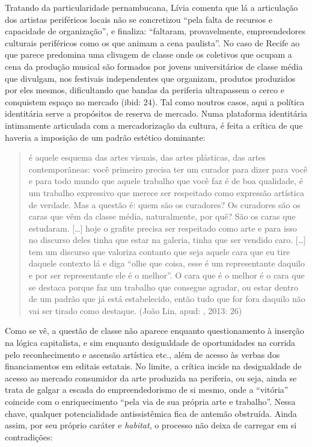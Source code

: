 Tratando da particularidade pernambucana, Lívia comenta que lá a
articulação dos artistas periféricos locais não se concretizou ``pela
falta de recursos e capacidade de organização'', e finaliza: ``faltaram,
provavelmente, empreendedores culturais periféricos como os que animam a
cena paulista''. No caso de Recife ao que parece predomina uma clivagem
de classe onde os coletivos que ocupam a cena da produção musical são
formados por jovens universitários de classe média que divulgam, nos
festivais independentes que organizam, produtos produzidos por eles
mesmos, dificultando que bandas da periferia ultrapassem o cerco e
conquistem espaço no mercado (ibid: 24). Tal como noutros casos, aqui a
política identitária serve a propósitos de reserva de mercado. Numa
plataforma identitária intimamente articulada com a mercadorização da
cultura, é feita a crítica de que haveria a imposição de um padrão
estético dominante:

\begin{quote}
é aquele esquema das artes visuais, das artes plásticas, das artes
contemporâneas: você primeiro precisa ter um curador para dizer para
você e para todo mundo que aquele trabalho que você faz é de boa
qualidade, é um trabalho expressivo que merece ser respeitado como
expressão artística de verdade. Mas a questão é: quem são os curadores?
Os curadores são os caras que vêm da classe média, naturalmente, por
quê? São os caras que estudaram. {[}\ldots{}{]} hoje o grafite precisa ser
respeitado como arte e para isso no discurso deles tinha que estar na
galeria, tinha que ser vendido caro. {[}\ldots{}{]} tem um discurso que
valoriza contanto que seja aquele cara que eu tire daquele contexto lá e
diga ``olhe que coisa, esse é um representante daquilo e por ser
representante ele é o melhor''. O cara que é o melhor é o cara que se
destaca porque faz um trabalho que consegue agradar, ou estar dentro de
um padrão que já está estabelecido, então tudo que for fora daquilo não
vai ser tirado como destaque. (João Lin, apud: , 2013: 26)
\end{quote}

Como se vê, a questão de classe não aparece enquanto questionamento à
inserção na lógica capitalista, e sim enquanto desigualdade de
oportunidades na corrida pelo reconhecimento e ascensão artística etc.,
além de acesso às verbas dos financiamentos em editais estatais. No
limite, a crítica incide na desigualdade de acesso ao mercado consumidor
da arte produzida na periferia, ou seja, ainda se trata de galgar a
escada do empreendedorismo de si mesmo, onde a ``vitória'' coincide com
o enriquecimento ``pela via de sua própria arte e trabalho''. Nessa
chave, qualquer potencialidade antissistêmica fica de antemão obstruída.
Ainda assim, por seu próprio caráter e \emph{habitat}, o processo não
deixa de carregar em si contradições:

